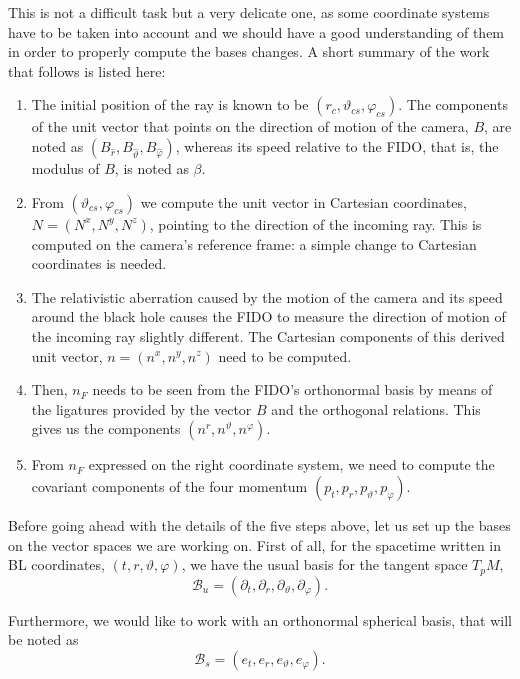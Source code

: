 This is not a difficult task but a very delicate one, as some coordinate systems have to be taken into account and we should have a good understanding of them in order to properly compute the bases changes. A short summary of the work that follows is listed here:
\begin{enumerate}
	\item The initial position of the ray is known to be $(r_c, \vartheta_{cs}, \varphi_{cs})$. The components of the unit vector that points on the direction of motion of the camera, $B$, are noted as $(B_{\widehat{r}}, B_{\widehat{\vartheta}}, B_{\widehat{\varphi}})$, whereas its speed relative to the \ac{FIDO}, that is, the modulus of $B$, is noted as $\beta$.
	\item From $(\vartheta_{cs}, \varphi_{cs})$ we compute the unit vector in Cartesian coordinates, $N = (N^x, N^y, N^z)$, pointing to the direction of the incoming ray. This is computed on the camera's reference frame: a simple change to Cartesian coordinates is needed.
	\item The relativistic aberration caused by the motion of the camera and its speed around the black hole causes the \ac{FIDO} to measure the direction of motion of the incoming ray slightly different. The Cartesian components of this derived unit vector, $n = (n^x, n^y, n^z)$ need to be computed.
	\item Then, $n_F$ needs to be seen from the \ac{FIDO}'s orthonormal basis by means of the ligatures provided by the vector $B$ and the orthogonal relations. This gives us the components $(n^r, n^\vartheta, n^\varphi)$.
	\item From $n_F$ expressed on the right coordinate system, we need to compute the covariant components of the four momentum $(p_t, p_r, p_\vartheta, p_\varphi)$.
\end{enumerate}

Before going ahead with the details of the five steps above, let us set up the bases on the vector spaces we are working on. First of all, for the spacetime written in \ac{BL} coordinates, $(t, r, \vartheta, \varphi)$, we have the usual basis for the tangent space $T_p M$,
\begin{equation}
\mathcal{B}_u = (\partial_t, \partial_r, \partial_\vartheta, \partial_\varphi).
\end{equation}

Furthermore, we would like to work with an orthonormal spherical basis, that will be noted as
\begin{equation}
\mathcal{B}_s = (e_t, e_r, e_\vartheta, e_\varphi).
\end{equation}


